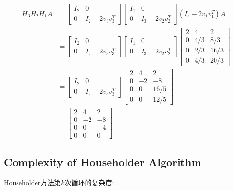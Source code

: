 \begin{problem}
    $$ \begin{aligned} H_{3} H_{2} H_{1} A &=\left[\begin{array}{cc}I_{2} & 0 \\ 0 & I_{2}-2 v_{3} v_{3}^{T}\end{array}\right]\left[\begin{array}{cc}I_{1} & 0 \\ 0 & I_{3}-2 v_{2} v_{2}^{T}\end{array}\right]\left(I_{4}-2 v_{1} v_{1}^{T}\right) A \\ &=\left[\begin{array}{cc}I_{2} & 0 \\ 0 & I_{2}-2 v_{3} v_{3}^{T}\end{array}\right]\left[\begin{array}{cc}I_{1} & 0 \\ 0 & I_{3}-2 v_{2} v_{2}^{T}\end{array}\right]\left[\begin{array}{ccc}2 & 4 & 2 \\ 0 & 4 / 3 & 8 / 3 \\ 0 & 2 / 3 & 16 / 3 \\ 0 & 4 / 3 & 20 / 3\end{array}\right] \\ &=\left[\begin{array}{cc}I_{2} & 0 \\ 0 & I_{2}-2 v_{3} v_{3}^{T}\end{array}\right]\left[\begin{array}{rrr}2 & 4 & 2 \\ 0 & -2 & -8 \\ 0 & 0 & 16 / 5 \\ 0 & 0 & 12 / 5\end{array}\right] \\ &=\left[\begin{array}{rrr}2 & 4 & 2 \\ 0 & -2 & -8 \\ 0 & 0 & -4 \\ 0 & 0 & 0\end{array}\right] \end{aligned} $$
\end{problem}

\subsection{Complexity of Householder Algorithm}

Householder方法第$k$次循环的复杂度:

